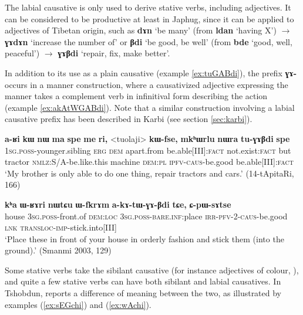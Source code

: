 \documentclass[oneside,a4paper,11pt]{article}
\newcommand{\ipa}[1]{\textbf{{\phon\mbox{#1}}}} %
\newcommand{\forme}[2]{\ipa{#1} `#2'}
\newcommand{\refb}[1]{(\ref{#1})}
\begin{document}
The labial causative is only used to derive stative verbs, including adjectives. It can be considered to be  productive at least in Japhug, since it can be applied to adjectives of Tibetan origin, such as \forme{dɤn}{be many} (from \forme{ldan}{having X}) $\rightarrow$ \forme{ɣɤdɤn}{increase the number of} or \forme{βdi}{be good, be well} (from \forme{bde}{good, well, peaceful}) $\rightarrow$ \forme{ɣɤβdi}{repair, fix, make better}.

In addition to its use as a plain causative (example \ref{ex:tuGABdi}), the prefix \ipa{ɣɤ-} occurs in a manner construction, where a causativized adjective expressing the manner takes a complement verb in infinitival form describing the action (example \ref{ex:akAtWGABdi}). Note that a similar construction involving a labial causative prefix has been described in Karbi (see section \ref{sec:karbi}).

\begin{exe}
\ex \label{ex:tuGABdi}
 \gll \ipa{a-ʁi} 	\ipa{kɯ} 	\ipa{nɯ} 	\ipa{ma} 	\ipa{spe} 	\ipa{me} 	\ipa{ri,} 	<tuolaji> 	\ipa{kɯ-fse,} 	\ipa{mkʰɯrlu} 	\ipa{nɯra} 	\ipa{tu-ɣɤβdi} 	\ipa{spe} \\
 \textsc{1sg.poss}-younger.sibling \textsc{erg} \textsc{dem} apart.from be.able[III]:\textsc{fact} not.exist:\textsc{fact} but tractor \textsc{nmlz}:S/A-be.like.this machine \textsc{dem:pl} \textsc{ipfv-caus}-be.good be.able[III]:\textsc{fact} \\
 \glt `My brother is only able to do one thing, repair tractors and cars.' (14-tApitaRi, 166)
\end{exe}

\begin{exe}
\ex \label{ex:akAtWGABdi}
\gll \ipa{kʰa} 	\ipa{ɯ-ʁɤri} 	\ipa{nɯtɕu} 	\ipa{ɯ-fkrɤm} 	\ipa{a-kɤ-tɯ-ɣɤ-βdi} 	\ipa{tɕe,} 	\ipa{ɕ-pɯ-sɤtse} \\
house \textsc{3sg.poss}-front.of \textsc{dem:loc} \textsc{3sg.poss-bare.inf}:place \textsc{irr-pfv-2-caus}-be.good \textsc{lnk} \textsc{transloc-imp}-stick.into[III] \\
\glt `Place these in front of your house in orderly fashion and stick them (into the ground).' (Smanmi 2003, 129)
\end{exe}


Some stative verbs take the sibilant causative (for instance adjectives of colour, \citealt[183]{jacques15causative}), and quite a few stative verbs can have both sibilant and labial causatives. In Tshobdun, \citet{jackson06paisheng, jackson14morpho} reports a difference of meaning between the two, as illustrated by examples \refb{ex:sEGchi} and \refb{ex:wAchi}.
\end{document}
